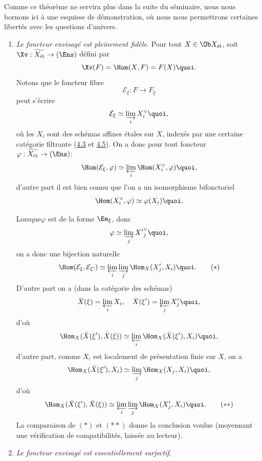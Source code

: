 \documentclass[10pt]{../fichiers-configuration-latex/smfart}
\begin{document}
Comme ce théorème ne servira plus dans la suite du séminaire, nous
nous bornons ici à une esquisse de démonstration, où nous nous
permettrons certaines libertés avec les questions d'univers.
\begin{enumerate}
\renewcommand{\theenumi}{\alph{enumi}}
\renewcommand{\labelenumi}{\theenumi)}
\item \emph{Le foncteur envisagé est pleinement fidèle}. Pour
  tout $X \in \Ob
  X_{\text{ét}}$, soit $\Xv : \widetilde{X_{\text{ét}}} \to
  (\Ens)$ défini par
$$
\Xv (F) = \Hom(X, F) = F(X){\quoi}.
$$
Notons que le foncteur fibre
$$
\mathcal{E}_{\xi} : F \to F_{\xi}
$$
peut s'écrire
$$
\mathcal{E}_{\xi} \simeq \varinjlim_i X^{\vee}_i{\quoi},
$$
où les $X_i$ sont des schémas affines étales sur $X$,
indexés par une
certaine catégorie filtrante (\cf \hyperref[VIII.def4.3]{4.3} et
\hyperref[VIII.subsec4.5]{4.5}). On a donc pour tout
foncteur $\varphi : \widetilde{X_{\text{ét}}} \to (\Ens)$:
$$
\Hom(\mathcal{E}_{\xi}, \varphi) \simeq \varprojlim_{i}
\Hom(X^{\vee}_i, \varphi){\quoi},
$$
d'autre part il est bien connu que l'on a un isomorphisme bifonctoriel
$$
\Hom(X^{\vee}_i, \varphi) \simeq \varphi (X_i){\quoi}.
$$

Lorsque\pageoriginale $\varphi$ est de la forme $\Ee_{\xi}$, donc
$$
\varphi \simeq \varinjlim_j {X'}_j^{\vee}{\quoi},
$$
on a donc une bijection naturelle
\begin{equation*}
\Hom (\mathcal{E}_{\xi}, \mathcal{E}_{\xi'}) \simeq
\varprojlim_{i} \varinjlim_{j} \Hom_X (X'_j, X_i){\quoi}.\tag{$\ast$}
\end{equation*}
D'autre part on a (dans la catégorie des schémas)
$$
\bar{X}(\xi) = \varprojlim_{i} X_i,\quad \bar{X} (\xi') =
\varprojlim_{j} X'_j{\quoi},
$$
d'où
$$
\Hom_{X} (\bar{X} (\xi'), \bar{X}(\xi)) \simeq \varprojlim_{i}
\Hom_X (\bar{X} (\xi'), X_i){\quoi},
$$
d'autre part, comme $X_i$ est localement de présentation finie sur
$X$, on a
$$
\Hom_X (\bar{X} (\xi'), X_i) \simeq \varinjlim_{j}
\Hom_X (X_j, X_i){\quoi},
$$
d'où
\begin{equation*}
\Hom_X (\bar{X} (\xi'), \bar{X} (\xi) ) \simeq
\varprojlim_{i} \varinjlim_{j} \Hom_X (X'_j,
X_i){\quoi}.\tag{${\ast}{\ast}$}
\end{equation*}
La comparaison de $(\ast)$ et $({\ast}{\ast})$ donne la conclusion voulue
(moyennant une vérification de compatibilités, laissée au lecteur).

\item \emph{Le foncteur envisagé est essentiellement surjectif}.
\end{enumerate}
\end{document}
